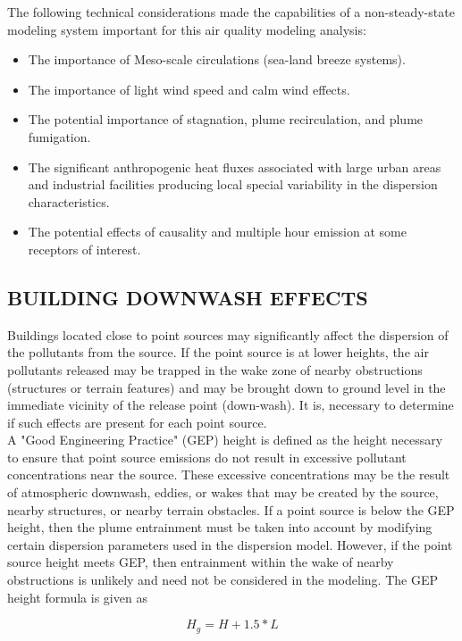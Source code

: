 The following technical considerations made the capabilities of a non-steady-state modeling system important for this air quality modeling analysis: 

\begin{itemize}
\item The importance of Meso-scale circulations (sea-land breeze systems).
\item The importance of light wind speed and calm wind effects.
\item The potential importance of stagnation, plume recirculation, and plume fumigation.
\item The significant anthropogenic heat fluxes associated with large urban areas and industrial facilities producing local special variability in the dispersion characteristics.
\item The potential effects of causality and multiple hour emission at some receptors of interest.
\end{itemize}

\subsection{BUILDING DOWNWASH EFFECTS}
Buildings located close to point sources may significantly affect the dispersion of the pollutants from the source. If the point source is at lower heights, the air pollutants released may be trapped in the wake zone of nearby obstructions (structures or terrain features) and may be brought down to ground level in the immediate vicinity of the release point (down-wash). It is, necessary to determine if such effects are present for each point source. \\

A "Good Engineering Practice" (GEP) height is defined as the height necessary to ensure that point source emissions do not result in excessive pollutant concentrations near the source. These excessive concentrations may be the result of atmospheric downwash, eddies, or wakes that may be created by the source, nearby structures, or nearby terrain obstacles. If a point source is below the GEP height, then the plume entrainment must be taken into account by modifying certain dispersion parameters used in the dispersion model. However, if the point source height meets GEP, then entrainment within the wake of nearby obstructions is unlikely and need not be considered in the modeling.
The GEP height formula is given as

\begin{equation}
H_{g} = H + 1.5*L 
\end{equation}

